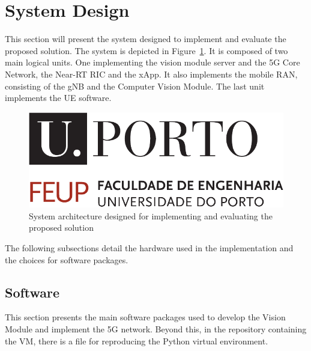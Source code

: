 \section{System Design}\label{sec:design}
This section will present the system designed to implement and evaluate the proposed solution.
The system is depicted in Figure~\ref{fig:design_arch}.
It is composed of two main logical units.
One implementing the vision module server and the 5G Core Network, the Near-RT RIC and the xApp.
It also implements the mobile RAN, consisting of the gNB and the Computer Vision Module. %
The last unit implements the UE software.


\begin{figure}
    \centering
    \includegraphics{figures/uporto-feup}
    \caption[System architecture designed for implementing and evaluating the proposed solution]{System architecture designed for implementing and evaluating the proposed solution}
    \label{fig:design_arch}
\end{figure}

The following subsections detail the hardware used in the implementation and the choices for software packages.


\subsection{Software}
This section presents the main software packages used to develop the Vision Module and implement the 5G network.
Beyond this, in the repository containing the VM, there is a file for reproducing the Python virtual environment.

